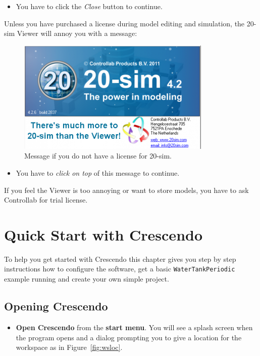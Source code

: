\documentclass{crescendorepchap}
\begin{document}
\begin{itemize}
\item
  You have to click the \emph{Close} button to continue.
\end{itemize}

Unless you have purchased a license during model editing and
simulation, the 20-sim Viewer will annoy you with a message:

\begin{figure}[htbp]
\centering
\includegraphics[width=.6\textwidth]{images/20simViewer.png}
\caption{Message if you do not have a license for 20-sim.}
\end{figure}

\begin{itemize}
\item
  You have to \emph{click on top} of this message to continue.
\end{itemize}

If you feel the Viewer is too annoying or want to store models, you have
to ask Controllab for trial license.

\chapter{Quick Start with Crescendo} \label{chap:gettingstarted}

To help you get started with Crescendo this chapter gives you step
by step instructions how to configure the software, get a basic
\texttt{WaterTankPeriodic} example running and create your own simple project.


\section{Opening Crescendo}

\begin{itemize}
\item
  \textbf{Open Crescendo} from the \textbf{start menu}.
You will see a splash screen when the program opens and a dialog
prompting you to give a location for the workspace as in Figure~\ref{fig:wsloc}.
\end{itemize}
\end{document}

